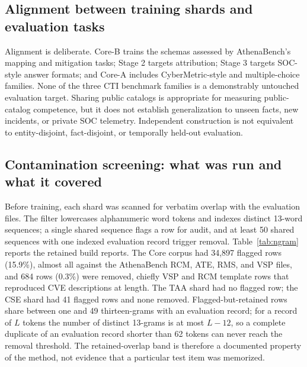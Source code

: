 \documentclass[preprint,12pt,authoryear]{elsarticle}
\begin{document}
\subsection{Alignment between training shards and evaluation tasks}
Alignment is deliberate. Core-B trains the schemas assessed by AthenaBench's mapping and mitigation tasks; Stage 2 targets attribution; Stage 3 targets SOC-style answer formats; and Core-A includes CyberMetric-style and multiple-choice families. None of the three CTI benchmark families is a demonstrably untouched evaluation target. Sharing public catalogs is appropriate for measuring public-catalog competence, but it does not establish generalization to unseen facts, new incidents, or private SOC telemetry. Independent construction is not equivalent to entity-disjoint, fact-disjoint, or temporally held-out evaluation.

\subsection{Contamination screening: what was run and what it covered}\label{sec:contamination}
Before training, each shard was scanned for verbatim overlap with the evaluation files. The filter lowercases alphanumeric word tokens and indexes distinct 13-word sequences; a single shared sequence flags a row for audit, and at least 50 shared sequences with one indexed evaluation record trigger removal. Table~\ref{tab:ngram} reports the retained build reports. The Core corpus had 34,897 flagged rows (15.9\%), almost all against the AthenaBench RCM, ATE, RMS, and VSP files, and 684 rows (0.3\%) were removed, chiefly VSP and RCM template rows that reproduced CVE descriptions at length. The TAA shard had no flagged row; the CSE shard had 41 flagged rows and none removed. Flagged-but-retained rows share between one and 49 thirteen-grams with an evaluation record; for a record of $L$ tokens the number of distinct 13-grams is at most $L-12$, so a complete duplicate of an evaluation record shorter than 62 tokens can never reach the removal threshold. The retained-overlap band is therefore a documented property of the method, not evidence that a particular test item was memorized.
\end{document}
